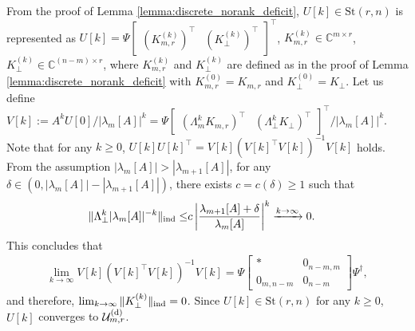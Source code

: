 \documentclass{ifacconf}
\begin{document}
\begin{pf}
From the proof of Lemma \ref{lemma:discrete_norank_deficit}, $U[k] \in \mathrm{St}(r,n)$ is represented as
$U[k] = \Psi  \begin{bmatrix}
    (K_{m,r}^{(k)})^{\top} & (K_{\perp} ^{(k)})^{\top}
    \end{bmatrix} ^{\top}$, $K_{m,r}^{(k)} \in \mathbb{C}^{m\times r}$, $K_{\perp}^{(k)} \in \mathbb{C}^{(n-m) \times r}$, 
where $K_{m,r}^{(k)}$ and $K_{\perp}^{(k)}$ are defined as in the proof of Lemma \ref{lemma:discrete_norank_deficit} with $K_{m,r}^{(0)} = K_{m,r}$ and $K_{\perp}^{(0)} = K_{\perp}$. 
Let us define $V[k] := A ^{k} U[0] / | \lambda _{m}[A] |^{k} = \Psi  \begin{bmatrix}
    (\Lambda _{m}^{k} K_{m,r})^{\top} & (\Lambda _{\perp}^{k} K_{\perp} )^{\top}
    \end{bmatrix} ^{\top} / | \lambda _{m}[A] |^{k}$.  
Note that for any $k\geq 0$, $U[k] U[k]^{\top} = V[k] (V[k]^{\top} V[k])^{-1} V[k] $ holds. 
From the assumption $| \lambda _{m} [A] | >| \lambda _{m+1} [A] | $, for any $\delta \in (0, | \lambda _{m}[A]| - |\lambda _{m+1}[A]|)$, there exists $c = c(\delta ) \geq 1$ such that
\begin{align*}
    \| \Lambda _{\perp} ^{k} |\lambda _{m}[A] |^{-k} \| _{\rm ind} \leq &
    c \left| \frac{  \lambda _{m+1}[A] +\delta }{  \lambda _{m}[A]  }\right| ^{k}
    \xrightarrow{k\to \infty} 0. 
\end{align*}
This concludes that 
\begin{align*}
\lim _{k\to \infty} V[k] (V[k]^{\top} V[k])^{-1} V[k] = \Psi 
\begin{bmatrix}
* & 0_{n-m,m} \\ 0_{m,n-m} & 0 _{n-m}
\end{bmatrix}
\Psi ^{\dagger}
,
\end{align*}
and therefore, $\lim _{k\to \infty} \| K_{\perp } ^{(k)} \| _{\rm ind} =  0$. 
Since $U[k] \in \mathrm{St}(r,n)$ for any $k\geq 0$,  
$U[k]$ converges to $\mathcal{U}_{m,r}^{\rm (d)}$.
\end{pf}
\end{document}
